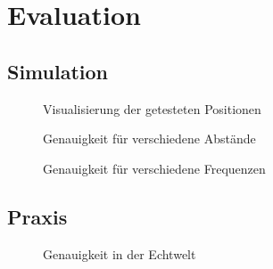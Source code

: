 \section{Evaluation} 
\subsection{Simulation}
\begin{figure}[H]
  \centering
  
  \caption{Visualisierung der getesteten Positionen}
  \label{fig:pos}
\end{figure}

\begin{figure}[H]
  \centering
  
  \caption{Genauigkeit für verschiedene Abstände}
  \label{fig:pos_sweep}
\end{figure}

\begin{figure}[H]
  \centering
  
  \caption{Genauigkeit für verschiedene Frequenzen}
  \label{fig:freq_seep}
\end{figure}

\subsection{Praxis}

\begin{figure}[H]
  \centering
  
  \caption{Genauigkeit in der Echtwelt}
  \label{fig:real}
\end{figure}
